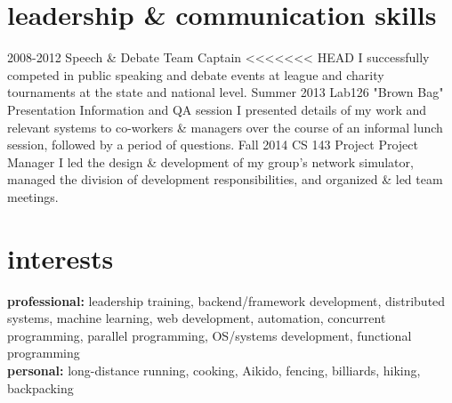 \documentclass[]{mills-cv} %
\begin{document}

\section{leadership \& communication skills}

\begin{entrylist}
\entry
{2008-2012}
{Speech \& Debate}
{Team Captain}
<<<<<<< HEAD
{I successfully competed in public speaking and debate events at league and charity tournaments at the state and national level.}
\entry
{Summer 2013}
{Lab126 "Brown Bag" Presentation}
{Information and QA session}
{I presented details of my work and relevant systems to co-workers \& managers over the course of an informal lunch session, followed by a period of questions.}
\entry
{Fall 2014}
{CS 143 Project}
{Project Manager}
{I led the design \& development of my group's network simulator, managed the division of development responsibilities, and organized \& led team meetings.}
\end{entrylist}


\section{interests}

\textbf{professional:} leadership training, backend/framework development, distributed systems, machine learning, web development, automation, concurrent programming, parallel programming, OS/systems development, functional programming
\\
\textbf{personal:} long-distance running, cooking, Aikido, fencing, billiards, hiking, backpacking
\end{document}
